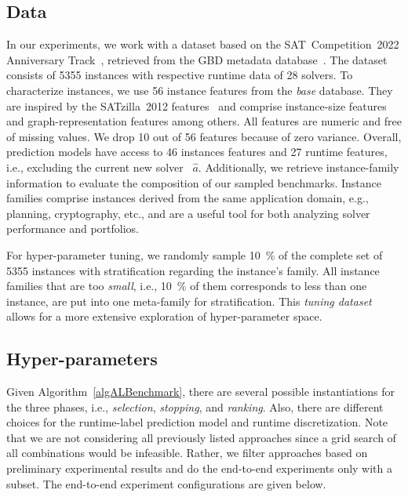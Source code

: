 \documentclass[runningheads]{llncs}
\begin{document}
\subsection{Data}

In our experiments, we work with a dataset based on the SAT~Competition~2022 Anniversary Track~\cite{sat2022}, retrieved from the GBD metadata database~\cite{IserS18}.
The dataset consists of 5355 instances with respective runtime data of 28 solvers.
To characterize instances, we use 56 instance features from the \emph{base} database.
They are inspired by the SATzilla~2012 features~\cite{features} and comprise instance-size features and graph-representation features among others.
All features are numeric and free of missing values.
We drop 10 out of 56 features because of zero variance.
Overall, prediction models have access to 46 instances features and 27 runtime features, i.e., excluding the current new solver~ $\hat{a}$.
Additionally, we retrieve instance-family information to evaluate the composition of our sampled benchmarks.
Instance families comprise instances derived from the same application domain, e.g., planning, cryptography, etc., and are a useful tool for both analyzing solver performance and portfolios.

For hyper-parameter tuning, we randomly sample \SI{10}{\%} of the complete set of 5355 instances with stratification regarding the instance's family.
All instance families that are too \emph{small}, i.e., \SI{10}{\%} of them corresponds to less than one instance, are put into one meta-family for stratification.
This \emph{tuning dataset} allows for a more extensive exploration of hyper-parameter space.

\subsection{Hyper-parameters}
\label{sec:exdesign:hyper}

Given Algorithm~\ref{algALBenchmark}, there are several possible instantiations for the three phases, i.e., \emph{selection}, \emph{stopping}, and \emph{ranking}.
Also, there are different choices for the runtime-label prediction model and runtime discretization.
Note that we are not considering all previously listed approaches since a grid search of all combinations would be infeasible.
Rather, we filter approaches based on preliminary experimental results and do the end-to-end experiments only with a subset.
The end-to-end experiment configurations are given below.
\end{document}
